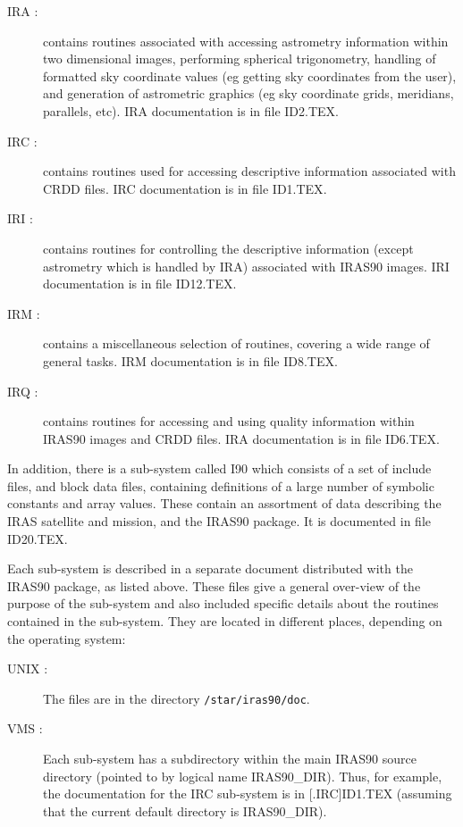 \begin{description}
\item [IRA :] contains routines associated with accessing astrometry information
within two dimensional images, performing spherical trigonometry, handling of
formatted sky coordinate values (eg getting sky coordinates from the user), and
generation of astrometric graphics (eg sky coordinate grids, meridians,
parallels, etc). {\small IRA} documentation is in file {\small ID2.TEX}.
\item [IRC :] contains routines used for accessing descriptive information 
associated with {\small CRDD} files. {\small IRC} documentation is in file 
{\small ID1.TEX}.
\item [IRI :] contains routines for controlling the descriptive information
(except astrometry which is handled by {\small IRA}) associated with {\small
IRAS90} images. {\small IRI} documentation is in file {\small ID12.TEX}.
\item [IRM :] contains a miscellaneous selection of routines, covering a wide 
range of general tasks. {\small IRM} documentation is in file {\small ID8.TEX}.
\item [IRQ :] contains routines for accessing and using quality information
within {\small IRAS90} images and {\small CRDD} files. {\small IRA}
documentation is in file {\small ID6.TEX}. 
\end{description}

In addition, there is a sub-system called I90 which consists of a set of include
files, and block data files, containing definitions of a large number of 
symbolic constants and array values. These contain an assortment of data 
describing the {\small IRAS} satellite and mission, and the {\small IRAS90} 
package. It is documented in file {\small ID20.TEX}.

Each sub-system is described in a separate document distributed with the {\small
IRAS90} package, as listed above. These files give a general over-view of the
purpose of the sub-system and also included specific details about the routines
contained in the sub-system. They are located in different places, depending on
the operating system: 

\begin{description}
\item [UNIX :] The files are in the directory \verb+/star/iras90/doc+.
\item [VMS :] Each sub-system has a subdirectory within the main {\small IRAS90}
source directory (pointed to by logical name {\small IRAS90\_DIR}). Thus, for
example, the documentation for the {\small IRC} sub-system is in [.IRC]ID1.TEX
(assuming that the current default directory is {\small IRAS90\_DIR}). 
\end{description}

